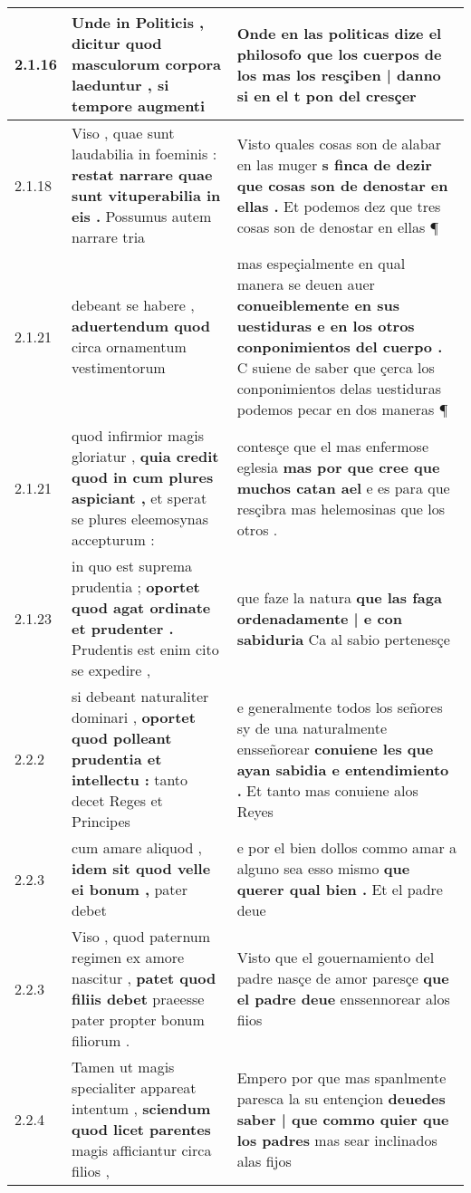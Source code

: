 \begin{tabular}{|p{1cm}|p{6.5cm}|p{6.5cm}|}
2.1.16 & Unde in Politicis , \textbf{ dicitur quod masculorum corpora laeduntur , } si tempore augmenti & Onde en las politicas dize el philosofo \textbf{ que los cuerpos de los mas los resçiben | danno } si en el t pon del cresçer \\\hline
2.1.18 & Viso , quae sunt laudabilia in foeminis : \textbf{ restat narrare quae sunt vituperabilia in eis . } Possumus autem narrare tria & Visto quales cosas son de alabar en las muger \textbf{ s finca de dezir que cosas son de denostar en ellas . } Et podemos dez que tres cosas son de denostar en ellas ¶ \\\hline
2.1.21 & debeant se habere , \textbf{ aduertendum quod } circa ornamentum vestimentorum & mas espeçialmente en qual manera se deuen auer \textbf{ conueiblemente en sus uestiduras e en los otros conponimientos del cuerpo . } C suiene de saber que çerca los conponimientos delas uestiduras podemos pecar en dos maneras ¶ \\\hline
2.1.21 & quod infirmior magis gloriatur , \textbf{ quia credit quod in cum plures aspiciant , } et sperat se plures eleemosynas accepturum : & contesçe que el mas enfermose eglesia \textbf{ mas por que cree que muchos catan ael } e es para que resçibra mas helemosinas que los otros . \\\hline
2.1.23 & in quo est suprema prudentia ; \textbf{ oportet quod agat ordinate et prudenter . } Prudentis est enim cito se expedire , & que faze la natura \textbf{ que las faga ordenadamente | e con sabiduria } Ca al sabio pertenesçe \\\hline
2.2.2 & si debeant naturaliter dominari , \textbf{ oportet quod polleant prudentia et intellectu : } tanto decet Reges et Principes & e generalmente todos los señores sy de una naturalmente ensseñorear \textbf{ conuiene les que ayan sabidia e entendimiento . } Et tanto mas conuiene alos Reyes \\\hline
2.2.3 & cum amare aliquod , \textbf{ idem sit quod velle ei bonum , } pater debet & e por el bien dollos commo amar a alguno sea esso mismo \textbf{ que querer qual bien . } Et el padre deue \\\hline
2.2.3 & Viso , quod paternum regimen ex amore nascitur , \textbf{ patet quod filiis debet } praeesse pater propter bonum filiorum . & Visto que el gouernamiento del padre nasçe de amor paresçe \textbf{ que el padre deue } enssennorear alos fiios \\\hline
2.2.4 & Tamen ut magis specialiter appareat intentum , \textbf{ sciendum quod licet parentes } magis afficiantur circa filios , & Empero por que mas spanlmente paresca la su entençion \textbf{ deuedes saber | que commo quier que los padres } mas sear inclinados alas fijos \\\hline

\end{tabular}
